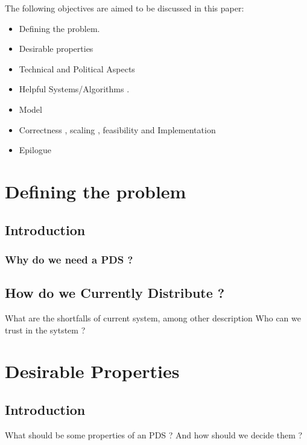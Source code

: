 \documentclass[12pt]{report}
\begin{document}
\vspace{0.5cm}

The following objectives are aimed to be discussed in this paper:
\begin{itemize}
  \item
  Defining the problem.
  \item
  Desirable properties 
  \item
  Technical and Political Aspects
  \item
  Helpful Systems/Algorithms .
  \item
  Model  
  \item
  Correctness , scaling , feasibility and Implementation
  \item 
  Epilogue
\end{itemize}

\chapter{Defining the problem}
\section{Introduction}
\subsection{Why do we need a PDS ?}
\section{How do we Currently Distribute ?}
What are the shortfalls of current system, among other description
Who can we trust in the sytstem ?


\chapter{Desirable Properties}
\section{Introduction}
What should be some properties of an PDS ? And how should we decide them ?
\end{document}
